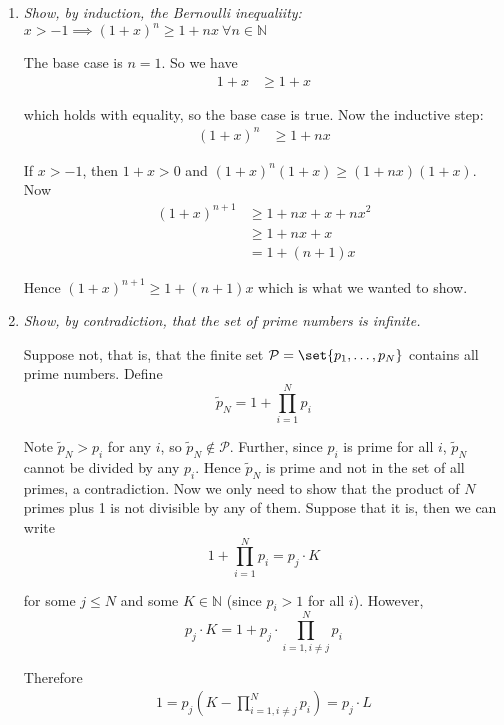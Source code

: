 \documentclass{article}
\begin{document}
\begin{enumerate}[1.]
  \item \textit{Show, by induction, the Bernoulli inequaliity: $x > -1 \implies (1 + x)^n \ge 1 + nx ~ \forall n \in \mathbb{N}$}

    \solution The base case is $n = 1$. So we have
    \begin{align*}
        1 + x & \ge 1 + x
    \end{align*}

    which holds with equality, so the base case is true. Now the inductive step:
    \begin{align*}
        (1 + x)^n & \ge 1 + nx
    \end{align*}

    If $x > -1$, then $1 + x > 0$ and $(1 + x)^n (1 + x) \ge (1 + nx) (1 + x)$. Now
    \begin{align*}
        (1 + x)^{n + 1} & \ge 1 + nx + x + nx^2 \\
                        & \ge 1 + nx + x        \\
                        & =   1 + (n + 1)x
    \end{align*}

    Hence $(1 + x)^{n + 1} \ge 1 + (n + 1)x$ which is what we wanted to show.

  \item \textit{Show, by contradiction, that the set of prime numbers is infinite.}

    \solution Suppose not, that is, that the finite set $\mathcal{P} =
      \set{p_1, \ldots, p_N}$ contains all prime numbers. Define
      \[
          \widetilde{p}_N = 1 + \prod_{i = 1}^N p_i
      \]

      Note $\widetilde{p}_N > p_i$ for any $i$, so $\widetilde{p}_N \notin \mathcal{P}$. Further, since $p_i$ is prime for all $i$, $\widetilde{p}_N$ cannot be divided by any $p_i$. Hence $\widetilde{p}_N$ is prime and not in the set of all primes, a contradiction. Now we only need to show that the product of $N$ primes plus 1 is not divisible by any of them. Suppose that it is, then we can write
      \[
          1 + \prod_{i = 1}^N p_i = p_j \cdot K
      \]

      for some $j \le N$ and some $K \in \mathbb{N}$ (since $p_i > 1$ for all $i$). However,
      \[
          p_j \cdot K = 1 + p_j \cdot \prod_{i = 1, i \ne j}^N p_i
      \]

      Therefore
      \begin{align*}
        1 = p_j \left(K - \prod_{i = 1, i \ne j}^N p_i\right) = p_j \cdot L
      \end{align*}


\end{enumerate}
\end{document}
